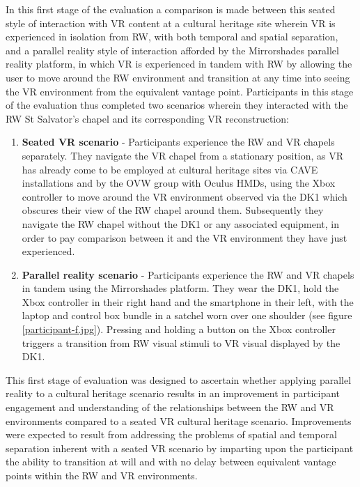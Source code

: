 In this first stage of the evaluation a comparison is made between this seated style of interaction with VR content at a cultural heritage site wherein VR is experienced in isolation from RW, with both temporal and spatial separation, and a parallel reality style of interaction afforded by the Mirrorshades parallel reality platform, in which VR is experienced in tandem with RW by allowing the user to move around the RW environment and transition at any time into seeing the VR environment from the equivalent vantage point. Participants in this stage of the evaluation thus completed two scenarios wherein they interacted with the RW St Salvator's chapel and its corresponding VR reconstruction:

\begin{enumerate}
	\item \textbf{Seated VR scenario} - Participants experience the RW and VR chapels separately. They navigate the VR chapel from a stationary position, as VR has already come to be employed at cultural heritage sites via CAVE installations and by the OVW group with Oculus HMDs, using the Xbox controller to move around the VR environment observed via the DK1 which obscures their view of the RW chapel around them. Subsequently they navigate the RW chapel without the DK1 or any associated equipment, in order to pay comparison between it and the VR environment they have just experienced.
	\item \textbf{Parallel reality scenario} - Participants experience the RW and VR chapels in tandem using the Mirrorshades platform. They wear the DK1, hold the Xbox controller in their right hand and the smartphone in their left, with the laptop and control box bundle in a satchel worn over one shoulder (see figure \ref{participant-f.jpg}). Pressing and holding a button on the Xbox controller triggers a transition from RW visual stimuli to VR visual displayed by the DK1.
\end{enumerate}

This first stage of evaluation was designed to ascertain whether applying parallel reality to a cultural heritage scenario results in an improvement in participant engagement and understanding of the relationships between the RW and VR environments compared to a seated VR cultural heritage scenario. Improvements were expected to result from addressing the problems of spatial and temporal separation inherent with a seated VR scenario by imparting upon the participant the ability to transition at will and with no delay between equivalent vantage points within the RW and VR environments.

